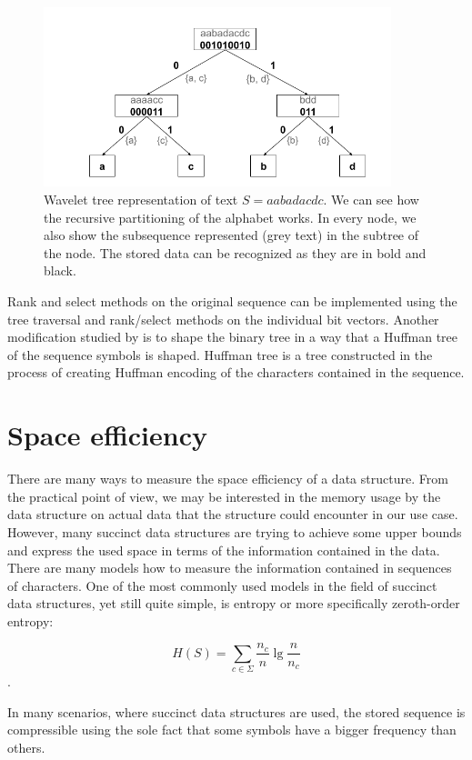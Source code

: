 \begin{figure}
	\centerline{
		\includegraphics[width=0.9\textwidth, height=0.3\textheight]{images/wavelet_tree}
	}
	\caption[TODO]{Wavelet tree representation of text $S=aabadacdc$. We can see how the
	recursive partitioning of the alphabet works. In every node, we also show the
	subsequence represented (grey text) in the subtree of the node. The stored data can be
	recognized as they are in bold and black.
	}
	\label{obr:WaveletTreeExample}
\end{figure}

Rank and select methods on the original sequence can be implemented using the tree
traversal and rank/select methods on the individual bit vectors. Another modification
studied by \cite{makinen2005succinct} is to shape the binary tree in a way that a Huffman
tree of the sequence symbols is shaped. Huffman tree is a tree constructed in the
process of creating Huffman encoding of the characters contained in the sequence.

\section{Space efficiency}

There are many ways to measure the space efficiency of a data structure. From the
practical point of view, we may be interested in the memory usage by the data
structure on actual data that the structure could encounter in our use case. However,
many succinct data structures are trying to achieve some upper bounds and express
the used space in terms of the information contained in the data. There are many
models how to measure the information contained in sequences of characters. One
of the most commonly used models in the field of succinct data structures, yet still
quite simple, is entropy or more specifically zeroth-order entropy:

$$H(S)=\sum_{c\in\Sigma} \frac{n_c}{n} \lg \frac{n}{n_c}$$.

In many scenarios, where succinct data structures are used, the stored sequence
is compressible using the sole fact that some symbols have a bigger frequency than others.